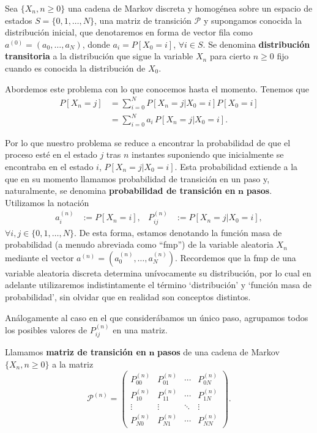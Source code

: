 Sea $\{X_n, n\geq 0\}$ una cadena de Markov discreta y homogénea sobre un espacio de estados $S=\{0,1,\dots,N\}$, una matriz de transición $\mathcal{P}$ y supongamos conocida la distribución inicial, que denotaremos en forma de vector fila como $a^{(0)} = (a_0, \dots, a_N)$, donde $a_i = P[X_0 = i]$, $\forall i \in S$. Se denomina \textbf{distribución transitoria} a la distribución que sigue la variable $X_n$ para cierto $n\geq 0$ fijo cuando es conocida la distribución de $X_0$.

Abordemos este problema con lo que conocemos hasta el momento. Tenemos que
\begin{equation}
    \label{eq:distr-trans}
    \begin{split}
        P[X_n = j] &= \sum_{i=0}^N P[X_n=j|X_0 = i]P[X_0=i] \\
        &= \sum_{i=0}^Na_i \, P[X_n=j|X_0 = i].
    \end{split}
\end{equation}

Por lo que nuestro problema se reduce a encontrar la probabilidad de que el proceso esté en el estado $j$ tras $n$ instantes suponiendo que inicialmente se encontraba en el estado $i$, $P[X_n=j|X_0 = i]$. Esta probabilidad extiende a la que en su momento llamamos probabilidad de transición en un paso y, naturalmente, se denomina \textbf{probabilidad de transición en }$\mathbf{n}$ \textbf{pasos}. Utilizamos la notación  
\begin{align*}
    a_i^{(n)} &:= P[X_n=i], & P_{ij}^{(n)} &:= P[X_{n}=j|X_0=i],
\end{align*}
$\forall i,j \in \{0,1,\dots,N\}$. De esta forma, estamos denotando la función masa de probabilidad (a menudo abreviada como ``fmp'') de la variable aleatoria $X_n$ mediante el vector $a^{(n)}=(a_0^{(n)},\dots,a_N^{(n)})$. Recordemos que la fmp de una variable aleatoria discreta determina unívocamente su distribución, por lo cual en adelante utilizaremos indistintamente el término `distribución' y `función masa de probabilidad', sin olvidar que en realidad son conceptos distintos. 

Análogamente al caso en el que considerábamos un único paso, agrupamos todos los posibles valores de $P_{ij}^{(n)}$ en una matriz.

\begin{definicion}
    Llamamos \textbf{matriz de transición en }$\mathbf{n}$ \textbf{pasos} de una cadena de Markov $\{X_n, n\geq 0\}$ a la matriz
    \begin{equation}
        \label{eq:matriz-trans-n}
        \mathcal P^{(n)}=\begin{pmatrix}
          P_{00}^{(n)} & P_{01}^{(n)} & \cdots & P_{0N}^{(n)} \\
          P_{10}^{(n)} & P_{11}^{(n)} & \cdots & P_{1N}^{(n)} \\
          \vdots & \vdots & \ddots & \vdots \\
          P_{N0}^{(n)} & P_{N1}^{(n)} & \cdots & P_{NN}^{(n)}  
        \end{pmatrix}.
    \end{equation}
\end{definicion}

